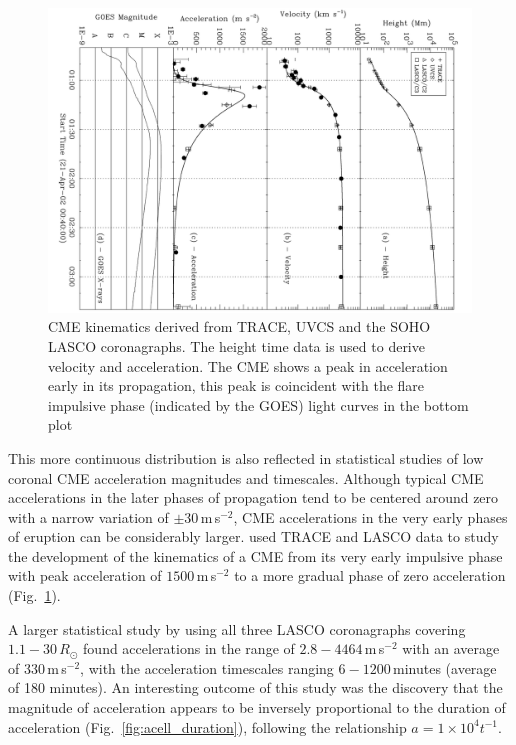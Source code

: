 \begin{figure}[t!]
\begin{center}
\includegraphics[scale=0.35, angle=90, trim=1cm 0cm 2cm 2cm]{images/gall_kins2003}
\caption[CME height, speed, and acceleration as function of time]{CME kinematics derived from TRACE, UVCS and the SOHO LASCO coronagraphs. The height time data is used to derive velocity and acceleration. The CME shows a peak in acceleration early in its propagation, this peak is coincident with the flare impulsive phase (indicated by the GOES) light curves in the bottom plot \citet{gallagher03}}
\label{fig:gall2003}
\end{center}
\end{figure}
This more continuous distribution is also reflected in statistical studies of low coronal CME acceleration magnitudes and timescales. Although typical CME accelerations in the later phases of propagation tend to be centered around zero with a narrow variation of $\pm30$\,m\,s$^{-2}$, CME accelerations in the very early phases of eruption can be considerably larger. \citet{gallagher03} used TRACE and LASCO data to study the development of the kinematics of a CME from its very early impulsive phase with peak acceleration of $1500$\,m\,s$^{-2}$ to a more gradual phase of zero acceleration (Fig.~\ref{fig:gall2003}). 

A larger statistical study by \citep{zhang2006} using all three LASCO coronagraphs covering $1.1-30\,R_{\odot}$ found accelerations in the range of $2.8-4464$\,m\,s$^{-2}$ with an average of 330\,m\,s$^{-2}$, with the acceleration timescales ranging $6-1200$\,minutes (average of 180 minutes). An interesting outcome of this study was the discovery that the magnitude of acceleration appears to be inversely proportional to the duration of acceleration (Fig.~\ref{fig:acell_duration}), following the relationship $a=1\times10^4t^{-1}$.

